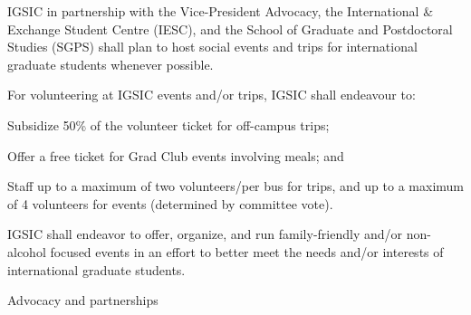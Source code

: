 \begin{longenum}[ label*=\thesubsection.\arabic*., align=left]
\begin{longenum}[ label*=\arabic*., align=left]
	\item IGSIC in partnership with the Vice-President Advocacy, the International \& Exchange Student Centre (IESC), and the School of Graduate and Postdoctoral Studies (SGPS) shall plan to host social events and trips for international graduate students whenever possible.
	\begin{longenum}[ label*=\arabic*., align=left]
		\item For volunteering at IGSIC events and/or trips, IGSIC shall endeavour
		to:
		\begin{longenum}[ label*=\arabic*., align=left]
			\item Subsidize 50\% of the volunteer ticket for off-campus trips;
			\item Offer a free ticket for Grad Club events involving meals; and
			\item Staff up to a maximum of two volunteers/per bus for trips, and up to a maximum of 4 volunteers for events (determined by committee vote).
		\end{longenum}
		\item IGSIC shall endeavor to offer, organize, and run family-friendly and/or non-alcohol focused events in an effort to better meet the needs and/or interests of international graduate students.
	\end{longenum}
	\end{longenum}
\item Advocacy and partnerships
	\begin{longenum}[ label*=\arabic*., align=left]

\end{longenum}
\end{longenum}
